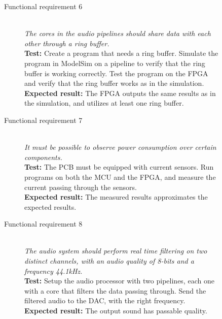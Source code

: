 \begin{figure}[H]
    \label{test:func-test6}
    \begin{description}
        \item[Functional requirement 6] \hfill \\
            \textit{The cores in the audio pipelines should share data with each other through a ring buffer.} \\
            \textbf{Test:} Create a program that needs a ring buffer.
            Simulate the program in ModelSim on a pipeline to verify that
            the ring buffer is working correctly.
            Test the program on the FPGA and verify that the ring buffer
            works as in the simulation. \\
            \textbf{Expected result:} The FPGA outputs the same results as in the simulation, and utilizes at least one ring buffer.
    \end{description}
\end{figure}

\begin{figure}[H]
    \label{test:func-test7}
    \begin{description}
        \item[Functional requirement 7] \hfill \\
            \textit{It must be possible to observe power consumption over certain components.} \\
            \textbf{Test:} The PCB must be equipped with current sensors. Run programs
            on both the MCU and the FPGA, and measure the current passing through the sensors. \\
            \textbf{Expected result:} The measured results approximates the expected results.
    \end{description}
\end{figure}

\begin{figure}[H]
    \label{test:func-test8}
    \begin{description}
        \item[Functional requirement 8] \hfill \\
            \textit{The audio system should perform real time filtering on
            two distinct channels, with an audio quality of 8-bits and a frequency 44.1kHz.} \\
            \textbf{Test:} Setup the audio processor with two pipelines, each one with a core
            that filters the data passing through. Send the filtered audio to the DAC, with the
            right frequency. \\
            \textbf{Expected result:} The output sound has passable quality.
    \end{description}
\end{figure}

